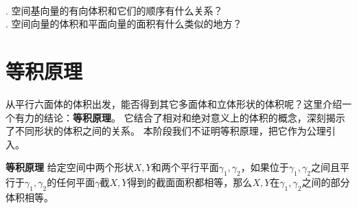 \documentclass[12pt,UTF8,fontset=none]{ctexbook}
\begin{document}
\begin{sk}
    \mbox{} \\
    . 空间基向量的有向体积和它们的顺序有什么关系？  \\
    . 空间向量的体积和平面向量的面积有什么类似的地方？
\end{sk}

\section{等积原理}

从平行六面体的体积出发，能否得到其它多面体和立体形状的体积呢？这里介绍一个有力的结论：\textbf{等积原理}。
它结合了相对和绝对意义上的体积的概念，深刻揭示了不同形状的体积之间的关系。
本阶段我们不证明等积原理，把它作为公理引入。
\begin{po}{\textbf{等积原理}}\label{po:6}
    给定空间中两个形状$X,Y$和两个平行平面$\gamma_1,\gamma_2$，如果位于$\gamma_1,\gamma_2$之间且平行于$\gamma_1,\gamma_2$的任何平面$\gamma$截$X,Y$得到的截面面积都相等，那么$X,Y$在$\gamma_1,\gamma_2$之间的部分体积相等。
\end{po}
\end{document}
